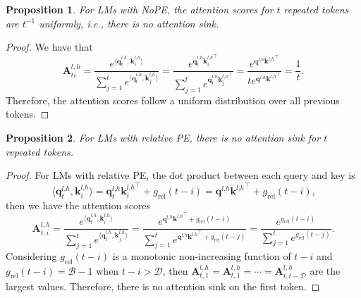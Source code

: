 \documentclass{article} \usepackage{iclr2025_conference,times}
\newtheorem{proposition}{Proposition}
\begin{document}
\begin{proposition}\label{prop1}
    For LMs with NoPE, the attention scores for $t$ repeated tokens are $t^{-1}$ uniformly, i.e., there is no attention sink.
\end{proposition}
\begin{proof}
    We have that
    \begin{equation}
\boldsymbol{A}_{ti}^{l\textrm{,}\,h}=\frac{e^{\langle\boldsymbol{q}_t^{l\textrm{,}h}\textrm{,}\,\boldsymbol{k}_i^{l\textrm{,}h}\rangle}}{\sum_{j=1}^t e^{\langle\boldsymbol{q}_t^{l\textrm{,}h}\textrm{,}\,\boldsymbol{k}_j^{l\textrm{,}h}\rangle}}=\frac{e^{\boldsymbol{q}_t^{l\textrm{,}h}{\boldsymbol{k}_i^{l\textrm{,}h}}^\top}}{\sum_{j=1}^te^{\boldsymbol{q}_t^{l\textrm{,}h}{\boldsymbol{k}_j^{l\textrm{,}h}}^\top}}=\frac{e^{\boldsymbol{q}^{l\textrm{,}h}{\boldsymbol{k}^{l\textrm{,}h}}^\top}}{te^{\boldsymbol{q}^{l\textrm{,}h}{\boldsymbol{k}^{l\textrm{,}h}}^\top}}=\frac{1}{t}\textrm{.}
\end{equation}
Therefore, the attention scores follow a uniform distribution over all previous tokens.
\end{proof}


\begin{proposition}\label{prop2}
    For LMs with relative PE, there is no attention sink for $t$ repeated tokens.
\end{proposition}
\begin{proof}
    For LMs with relative PE, the dot product between each query and key is
\begin{equation}
\langle\boldsymbol{q}_t^{l\textrm{,}h}\textrm{,}\,\boldsymbol{k}_i^{l\textrm{,}h}\rangle=\boldsymbol{q}_t^{l\textrm{,}h}{\boldsymbol{k}_i^{l\textrm{,}h}}^\top + g_{\textrm{rel}}(t-i)=\boldsymbol{q}^{l\textrm{,}h}{\boldsymbol{k}^{l\textrm{,}h}}^\top + g_{\textrm{rel}}(t-i)\textrm{,}
\end{equation}
then we have the attention scores
\begin{equation}
\boldsymbol{A}_{t\textrm{,}\,i}^{l\textrm{,}\,h}=\frac{e^{\langle\boldsymbol{q}_t^{l\textrm{,}h}\textrm{,}\,\boldsymbol{k}_i^{l\textrm{,}h}\rangle}}{\sum_{j=1}^t e^{\langle\boldsymbol{q}_t^{l\textrm{,}h}\textrm{,}\,\boldsymbol{k}_j^{l\textrm{,}h}\rangle}}=\frac{e^{\boldsymbol{q}^{l\textrm{,}h}{\boldsymbol{k}^{l\textrm{,}h}}^\top+g_{\textrm{rel}}(t-i)}}{\sum_{j=1}^te^{\boldsymbol{q}^{l\textrm{,}h}{\boldsymbol{k}^{l\textrm{,}h}}^\top+g_{\textrm{rel}}(t-j)}}=\frac{e^{g_{\textrm{rel}}(t-i)}}{\sum_{j=1}^te^{g_{\textrm{rel}}(t-j)}}\textrm{.}
\end{equation}
Considering $g_{\textrm{rel}}(t-i)$ is a monotonic non-increasing function of $t-i$ and $g_{\textrm{rel}}(t-i)=\mathcal{B}-1$ when $t-i>\mathcal{D}$, then $\boldsymbol{A}_{t\textrm{,}\,1}^{l\textrm{,}\,h}=\boldsymbol{A}_{t\textrm{,}\,1}^{l\textrm{,}\,h}=\cdots=\boldsymbol{A}_{t\textrm{,}\,t-\mathcal{D}}^{l\textrm{,}\,h}$ are the largest values. Therefore, there is no attention sink on the first token.
\end{proof}
\end{document}
